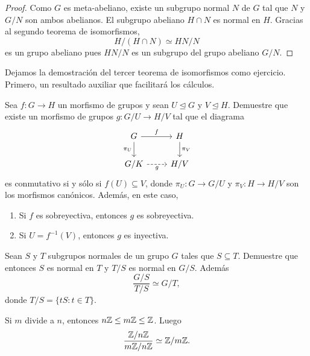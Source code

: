 \begin{proof}
Como $G$ es meta-abeliano, existe 
un subgrupo normal $N$ de $G$ tal que $N$ y $G/N$ son ambos abelianos. 
El subgrupo abeliano $H\cap N$ es normal en $H$. Gracias al segundo teorema de isomorfismos,
\[
H/(H\cap N)\simeq HN/N
\]
es un grupo abeliano pues $HN/N$ es un subgrupo del grupo abeliano $G/N$.   
\end{proof}

Dejamos la demostración del tercer teorema de isomorfismos como ejercicio. Primero, 
un resultado auxiliar que facilitará los cálculos. 

\begin{exercise}
	\label{xca:para_3er}
	Sea $f\colon G\to H$ un morfismo de grupos y sean $U\unlhd G$ y $V\unlhd H$. Demuestre que existe 
	un morfismo de grupos $g\colon G/U\to H/V$ tal que el diagrama
\[
\begin{tikzcd}
	G & H \\
	{G/K} & {H/V}
	\arrow["f", from=1-1, to=1-2]
	\arrow["{\pi_U}"', from=1-1, to=2-1]
	\arrow["g"', dashed, from=2-1, to=2-2]
	\arrow["{\pi_V}", from=1-2, to=2-2]
\end{tikzcd}
\]
	es conmutativo si y sólo si $f(U)\subseteq V$, donde $\pi_U\colon G\to G/U$ y $\pi_V\colon H\to H/V$ son los morfismos canónicos. Además, en este caso, 
	\begin{enumerate}
	\item Si $f$ es sobreyectiva, entonces $g$ es sobreyectiva.
	\item Si $U=f^{-1}(V)$, entonces $g$ es inyectiva. 	
	\end{enumerate}
\end{exercise}


\begin{exercise}
\label{xca:3er}
Sean $S$ y $T$ subgrupos normales de un grupo $G$ tales que $S\subseteq T$. Demuestre que 
entonces $S$ es normal en $T$ 
y $T/S$ es normal en $G/S$. Además
\[
\frac{G/S}{T/S}\simeq G/T,
\]
donde $T/S=\{tS:t\in T\}$.
\end{exercise}

\begin{example}
Si $m$ divide a $n$, entonces $n\mathbb{Z}\leq m\mathbb{Z}\leq\mathbb{Z}$. Luego
\[
\frac{\mathbb{Z}/n\mathbb{Z}}{m\mathbb{Z}/n\mathbb{Z}}\simeq\mathbb{Z}/m\mathbb{Z}.
\]	
\end{example}

